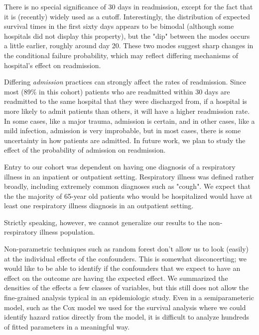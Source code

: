 \documentclass[]{article}\usepackage[]{graphicx}\usepackage[]{color}
\begin{document}
There is no special significance of 30 days in readmission, except for the fact that it is (recently) widely used as a cutoff. Interestingly, the distribution of expected survival times in the first sixty days appears to be bimodal (although some hospitals did not display this property), but the "dip" between the modes occurs a little earlier, roughly around day 20. These two modes suggest sharp changes in the conditional failure probability, which may reflect differing mechanisms of hospital's effect on readmission. 

Differing \emph{admission} practices can strongly affect the rates of readmission. Since most  (89\% in this cohort) patients who are readmitted within 30 days are readmitted to the same hospital that they were discharged from, if a hospital is more likely to admit patients than others, it will have a higher readmission rate. In some cases, like a major trauma, admission is certain, and in other cases, like a mild infection, admission is very improbable, but in most cases, there is some uncertainty in how patients are admitted. In future work, we plan to study the effect of the probability of admission on readmission.

Entry to our cohort was dependent on having one diagnosis of a respiratory illness in an inpatient or outpatient setting. Respiratory illness was defined rather broadly, including extremely common diagnoses such as "cough". We expect that the the majority of 65-year old patients who would be hospitalized would have at least one respiratory illness diagnosis in an outpatient setting. 

Strictly speaking, however, we cannot generalize our results to the non-respiratory illness population. 

Non-parametric techniques such as random forest don't allow us to look (easily) at the individual effects of the confounders. This is somewhat disconcerting; we would like to be able to identify if the confounders that we expect to have an effect on the outcome are having the expected effect. We summarized the densities of the effects a few classes of variables, but this still does not allow the fine-grained analysis typical in an epidemiologic study. Even in a semiparameteric model, such as the Cox model we used for the survival analysis where we could identify hazard ratios directly from the model, it is difficult to analyze hundreds of fitted parameters in a meaningful way. 
\end{document}
